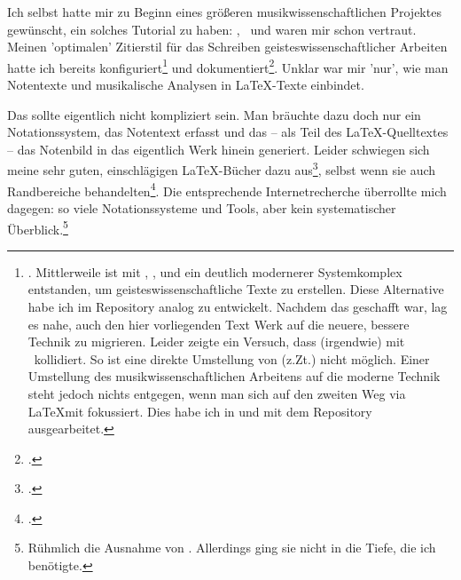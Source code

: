 

%
%

Ich selbst hatte mir zu Beginn eines größeren musikwissenschaftlichen Projektes gewünscht, ein solches Tutorial zu haben: \acc{\LaTeX}, \ und  waren mir schon vertraut. Meinen 'optimalen' Zitierstil für das Schreiben geisteswissenschaftlicher Arbeiten hatte ich bereits konfiguriert\footnote{\cite[vgl.][\nopage wp]{Reincke2018a}. Mittlerweile ist mit \acc{\LaTeX}, ,  und  ein deutlich modernerer Systemkomplex entstanden, um geisteswissenschaftliche Texte zu erstellen. Diese Alternative habe ich im Repository  analog zu  entwickelt. Nachdem das geschafft war, lag es nahe, auch den hier vorliegenden Text  Werk auf die neuere, bessere Technik zu migrieren. Leider zeigte ein Versuch, dass  (irgendwie) mit \ kollidiert. So ist eine direkte Umstellung von  (z.Zt.) nicht möglich. Einer Umstellung des musikwissenschaftlichen Arbeitens  auf die moderne Technik steht jedoch nichts entgegen, wenn man sich auf den zweiten Weg via \LaTeX mit  fokussiert. Dies habe ich in und mit dem Repository  ausgearbeitet.} und dokumentiert\footnote{\cite[vgl][2ff]{Reincke2018b}.}. Unklar war mir 'nur', wie man Notentexte und musikalische Analysen in \LaTeX-Texte einbindet.

Das sollte eigentlich nicht kompliziert sein. Man bräuchte dazu doch nur ein No\-ta\-tions\-system, das Notentext erfasst und das -- als Teil des \LaTeX-Quelltextes -- das Notenbild in das eigentlich Werk hinein generiert. Leider schwiegen sich meine sehr guten, einschlägigen \LaTeX-Bücher dazu aus\footcite[vgl.][vi ff, insbesondere 905 u. 909: das umfangreiche Register erwähnt weder Musik im allgemeinen noch LilyPond oder MusiX\TeX\ im Besonderen]{Voss2012a}, selbst wenn sie auch Randbereiche behandelten\footcite[vgl.][vii ff, insbesondere 1080 u. 1087: auch dieses umfangreiche Register erwähnt weder Musik im allgemeinen noch LilyPond oder MusiX\TeX\ im Besonderen.]{MitGoo2005a}. Die entsprechende Internetrecherche überrollte mich dagegen: so viele Notationssysteme und Tools, aber kein systematischer Überblick.\footnote{Rühmlich die Ausnahme von \cite[][\nopage wp.]{Thoma2018a}. Allerdings ging sie nicht in die Tiefe, die ich benötigte.}

